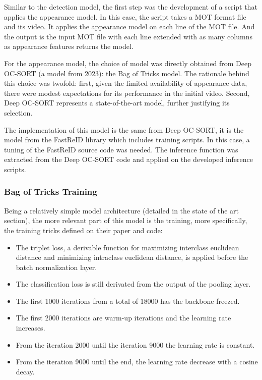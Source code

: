 
{
    Similar to the detection model, the first step was the development of a script that applies the appearance model. 
    In this case, the script takes a MOT format file and its video.
    It applies the appearance model on each line of the MOT file.
    And the output is the input MOT file with each line extended with as many columns as appearance features returns the model.
}

{
    For the appearance model, the choice of model was directly obtained from Deep OC-SORT (a model from 2023): the Bag of Tricks model\cite{Luo_2019_CVPR_Workshops}. 
    The rationale behind this choice was twofold: 
    first, given the limited availability of appearance data, there were modest expectations for its performance in the initial video. 
    Second, Deep OC-SORT represents a state-of-the-art model, further justifying its selection.
}

{
    The implementation of this model is the same from Deep OC-SORT, it is the model from the FastReID\cite{he2020fastreid} library which includes training scripts. 
    In this case, a tuning of the FastReID source code was needed. The inference function was extracted from the Deep OC-SORT code and applied on the developed inference scripts.
}

\subsubsection{Bag of Tricks Training}

{
    Being a relatively simple model architecture (detailed in the state of the art section), 
    the more relevant part of this model is the training, more specifically, the training tricks defined on their paper and code:
}

\begin{itemize}
    \item The triplet loss, a derivable function for maximizing interclass euclidean distance and minimizing intraclass euclidean distance, is applied before the batch normalization layer.
    \item The classification loss is still derivated from the output of the pooling layer.
    \item The first 1000 iterations from a total of 18000 has the backbone freezed.
    \item The first 2000 iterations are warm-up iterations and the learning rate increases.
    \item From the iteration 2000 until the iteration 9000 the learning rate is constant.
    \item From the iteration 9000 until the end, the learning rate decrease with a cosine decay.
\end{itemize}

